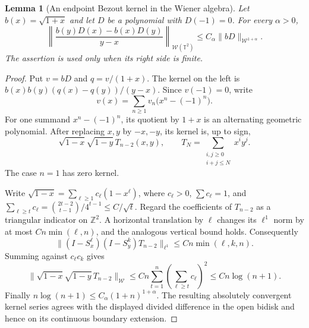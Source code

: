 \documentclass[11pt]{article}
\newtheorem{lemma}[proposition]{Lemma}
\newcommand{\T}{\mathbb T}
\begin{document}
\begin{lemma}[An endpoint Bezout kernel in the Wiener algebra]
\label{lem:endpoint-bezout}
Let $b(x)=\sqrt{1+x}$ and let $D$ be a polynomial with $D(-1)=0$.
For every $\alpha>0$,
\[
 \left\|\frac{b(y)D(x)-b(x)D(y)}{y-x}\right\|_{\mathcal W(\T^2)}
 \le C_\alpha\|bD\|_{\mathcal W^{1+\alpha}}.
\]
The assertion is used only when its right side is finite.
\end{lemma}
\begin{proof}
Put $v=bD$ and $q=v/(1+x)$. The kernel on the left is
$b(x)b(y)(q(x)-q(y))/(y-x)$. Since $v(-1)=0$, write
\[
 v(x)=\sum_{n\ge1}v_n\bigl(x^n-(-1)^n\bigr).
\]
For one summand $x^n-(-1)^n$, its quotient by $1+x$ is an
alternating geometric polynomial. After replacing $x,y$ by $-x,-y$,
its kernel is, up to sign,
\[
 \sqrt{1-x}\sqrt{1-y}\,T_{n-2}(x,y),\qquad
 T_N=\sum_{\substack{i,j\ge0\\i+j\le N}}x^iy^j.
\]
The case $n=1$ has zero kernel.

Write $\sqrt{1-x}=\sum_{\ell\ge1}c_\ell(1-x^\ell)$, where
$c_\ell>0$, $\sum c_\ell=1$, and
$\sum_{\ell\ge t}c_\ell=\binom{2t-2}{t-1}/4^{t-1}\le C/\sqrt t$.
Regard the coefficients of $T_{n-2}$ as a triangular indicator
on $\mathbb Z^2$. A horizontal translation by $\ell$ changes its
$\ell^1$ norm by at most $Cn\min(\ell,n)$, and the analogous
vertical bound holds. Consequently
\[
 \|(I-S_x^\ell)(I-S_y^k)T_{n-2}\|_{\ell^1}
       \le Cn\min(\ell,k,n).
\]
Summing against $c_\ell c_k$ gives
\[
 \|\sqrt{1-x}\sqrt{1-y}\,T_{n-2}\|_{\mathcal W}
 \le Cn\sum_{t=1}^n\left(\sum_{\ell\ge t}c_\ell\right)^2
 \le Cn\log(n+1).
\]
Finally $n\log(n+1)\le C_\alpha(1+n)^{1+\alpha}$.
The resulting absolutely convergent kernel series agrees with the
displayed divided difference in the open bidisk and hence on its
continuous boundary extension.
\end{proof}
\end{document}
